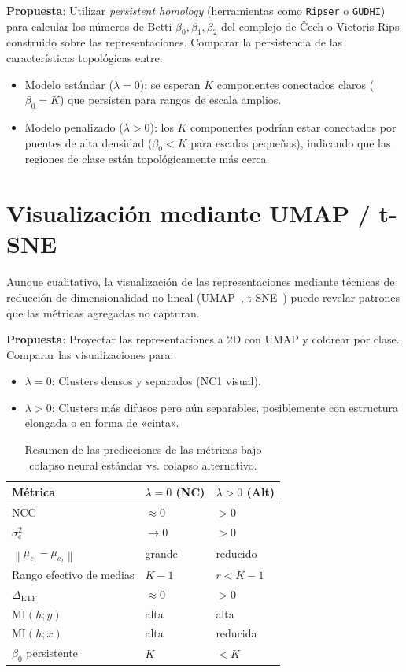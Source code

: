 \documentclass[12pt,a4paper]{report}
\newcommand{\norm}[1]{\left\lVert#1\right\rVert}
\newcommand{\MI}{\text{MI}}
\begin{document}
\textbf{Propuesta}: Utilizar \emph{persistent homology} (herramientas como \texttt{Ripser} o \texttt{GUDHI}) para calcular los números de Betti $\beta_0, \beta_1, \beta_2$ del complejo de Čech o Vietoris-Rips construido sobre las representaciones. Comparar la persistencia de las características topológicas entre:

\begin{itemize}
    \item Modelo estándar ($\lambda=0$): se esperan $K$ componentes conectados claros ($\beta_0 = K$) que persisten para rangos de escala amplios.
    \item Modelo penalizado ($\lambda>0$): los $K$ componentes podrían estar conectados por puentes de alta densidad ($\beta_0 < K$ para escalas pequeñas), indicando que las regiones de clase están topológicamente más cerca.
\end{itemize}

\section{Visualización mediante UMAP / t-SNE}

Aunque cualitativo, la visualización de las representaciones mediante técnicas de reducción de dimensionalidad no lineal (UMAP~\cite{mcinnes2018umap}, t-SNE~\cite{van2008visualizing}) puede revelar patrones que las métricas agregadas no capturan.

\textbf{Propuesta}: Proyectar las representaciones a 2D con UMAP y colorear por clase. Comparar las visualizaciones para:
\begin{itemize}
    \item $\lambda = 0$: Clusters densos y separados (NC1 visual).
    \item $\lambda > 0$: Clusters más difusos pero aún separables, posiblemente con estructura elongada o en forma de «cinta».

\end{itemize}

\begin{table}[h]
\centering
\begin{tabular}{p{4cm} p{4cm} p{4cm}}
\hline\hline
\textbf{Métrica} & \textbf{$\lambda=0$ (NC)} & \textbf{$\lambda>0$ (Alt)} \\
\hline
NCC & $\approx 0$ & $> 0$ \\
$\sigma_c^2$ & $\to 0$ & $> 0$ \\
$\norm{\mu_{c_1} - \mu_{c_2}}$ & grande & reducido \\
Rango efectivo de medias & $K-1$ & $r < K-1$ \\
$\Delta_{\text{ETF}}$ & $\approx 0$ & $> 0$ \\
$\MI(h; y)$ & alta & alta \\
$\MI(h; x)$ & alta & reducida \\
$\beta_0$ persistente & $K$ & $< K$ \\
\hline\hline
\end{tabular}
\caption{Resumen de las predicciones de las métricas bajo colapso neural estándar vs. colapso alternativo.}
\label{tab:metric_predictions}
\end{table}
\end{document}
